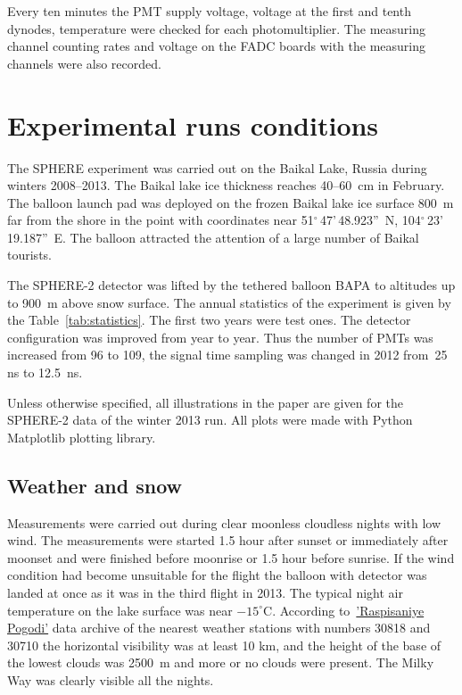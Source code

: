 \documentclass[final,5p,times,twocolumn]{elsarticle}
\begin{document}
Every ten minutes the PMT supply voltage, voltage at the first and tenth dynodes, temperature were checked for each photomultiplier. The measuring channel counting rates and voltage on the FADC boards with the measuring channels were also recorded.

\section{Experimental runs conditions}
\label{sect:data}
 
The SPHERE experiment was carried out on the Baikal Lake, Russia during winters 2008--2013. The Baikal lake ice thickness reaches 40--60~cm in February. The balloon launch pad was deployed on the frozen Baikal lake ice surface 800~m far from the shore in the point with coordinates near 51$^\circ$\,47'\,48.923''~N, 104$^\circ$\,23'\,19.187''~E. 
The balloon attracted the attention of a large number of Baikal tourists. 

The \mbox{SPHERE-2} detector was lifted by the tethered balloon BAPA to altitudes up to 900~m above snow surface. The annual statistics of the experiment is given by the Table~\ref{tab:statistics}. The first two years were test ones. The detector configuration was improved from year to year. Thus the number of PMTs was increased from 96 to 109, the signal time sampling was changed in 2012 from~25 ns to 12.5~ns.

Unless otherwise specified, all illustrations in the paper are given for the \mbox{SPHERE-2} data of the winter 2013 run. All plots were made with Python Matplotlib plotting library.


\subsection{Weather and snow}

Measurements were carried out during clear moonless cloudless nights with low wind. The measurements were started 1.5 hour after sunset or immediately after moonset and were finished before moonrise or 1.5 hour before sunrise. If the wind condition had become unsuitable for the flight the balloon with detector was landed at once as it was in the third flight in 2013. The typical night air temperature on the lake surface was near $-15^\circ$C. According to~\href{https://rp5.ru/}{'Raspisaniye Pogodi'} data archive of the nearest weather stations with numbers 30818 and 30710 the horizontal visibility was at least 10 km, and the height of the base of the lowest clouds was 2500~m and more or no clouds were present. The Milky Way was clearly visible all the nights.
\end{document}
